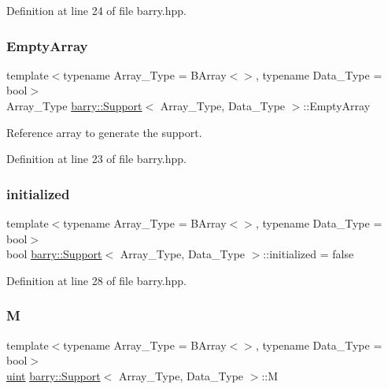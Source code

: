 Definition at line 24 of file barry.\+hpp.

\mbox{\label{classbarry_1_1_support_ae26e46356041286028ffcc27195b9e8a}} 
\subsubsection{\texorpdfstring{Empty\+Array}{EmptyArray}}
{\footnotesize\ttfamily template$<$typename Array\+\_\+\+Type  = B\+Array$<$$>$, typename Data\+\_\+\+Type  = bool$>$ \\
Array\+\_\+\+Type \hyperlink{classbarry_1_1_support}{barry\+::\+Support}$<$ Array\+\_\+\+Type, Data\+\_\+\+Type $>$\+::Empty\+Array}



Reference array to generate the support. 



Definition at line 23 of file barry.\+hpp.

\mbox{\label{classbarry_1_1_support_a737bc10d6a6e4e3b18aeef0228bd45bb}} 
\subsubsection{\texorpdfstring{initialized}{initialized}}
{\footnotesize\ttfamily template$<$typename Array\+\_\+\+Type  = B\+Array$<$$>$, typename Data\+\_\+\+Type  = bool$>$ \\
bool \hyperlink{classbarry_1_1_support}{barry\+::\+Support}$<$ Array\+\_\+\+Type, Data\+\_\+\+Type $>$\+::initialized = false}



Definition at line 28 of file barry.\+hpp.

\mbox{\label{classbarry_1_1_support_aaceb2f83d235c70034e089087991cff8}} 
\subsubsection{\texorpdfstring{M}{M}}
{\footnotesize\ttfamily template$<$typename Array\+\_\+\+Type  = B\+Array$<$$>$, typename Data\+\_\+\+Type  = bool$>$ \\
\hyperlink{namespacebarry_a11dfc53ddb4672278319aa04f1e09a6c}{uint} \hyperlink{classbarry_1_1_support}{barry\+::\+Support}$<$ Array\+\_\+\+Type, Data\+\_\+\+Type $>$\+::M}



